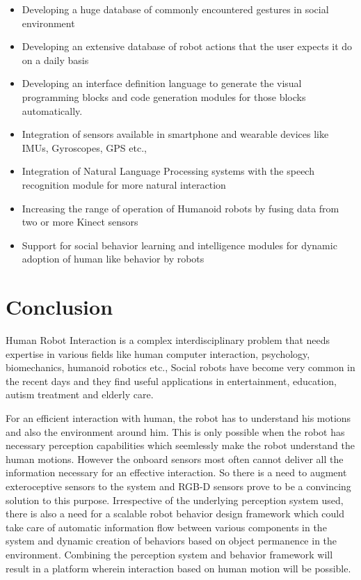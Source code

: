 \begin{itemize}
\item Developing a huge database of commonly encountered gestures in social environment
\item Developing an extensive database of robot actions that the user expects it do on a daily basis
\item Developing an interface definition language to generate the visual programming blocks and code generation modules for those blocks automatically.
\item Integration of sensors available in smartphone and wearable devices like IMUs, Gyroscopes, GPS etc.,
\item Integration of Natural Language Processing systems with the speech recognition module for more natural interaction
\item Increasing the range of operation of Humanoid robots by fusing data from two or more Kinect sensors 
\item Support for social behavior learning and intelligence modules for dynamic adoption of human like behavior by robots
\end{itemize}

\section{Conclusion} %
	Human Robot Interaction is a complex interdisciplinary problem that needs expertise in various fields like human computer interaction, psychology, biomechanics, humanoid robotics etc., Social robots have become very common in the recent days and they find useful applications in entertainment, education, autism treatment and elderly care. 
	
	For an efficient interaction with human, the robot has to understand his motions and also the environment around him. This is only possible when the robot has necessary perception capabilities which seemlessly make the robot understand the human motions. However the onboard sensors most often cannot deliver all the information necessary for an effective interaction. So there is a need to augment exteroceptive sensors to the system and RGB-D sensors prove to be a convincing solution to this purpose. Irrespective of the underlying perception system used, there is also a need for a scalable robot behavior design framework which could take care of automatic information flow between various components in the system and dynamic creation of behaviors based on object permanence in the environment. Combining the perception system and behavior framework will result in a platform wherein interaction based on human motion will be possible. 
	
